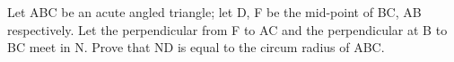 \item Let ABC be an acute angled triangle; let D, F be the mid-point of BC, AB respectively. Let the perpendicular from F to AC and the perpendicular at B to BC meet in N. Prove that ND is equal to the circum radius of ABC.

